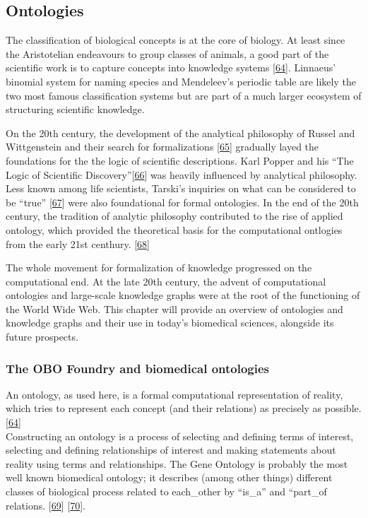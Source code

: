 \hypertarget{ontologies}{%
\subsection{Ontologies}\label{ontologies}}

The classification of biological concepts is at the core of biology. At least since the Aristotelian endeavours to group classes of animals, a good part of the scientific work is to capture concepts into knowledge systems {[}\protect\hyperlink{ref-DLTMbf54}{64}{]}.
Linnaeus' binomial system for naming species and Mendeleev's periodic table are likely the two most famous classification systems but are part of a much larger ecosystem of structuring scientific knowledge.

On the 20th century, the development of the analytical philosophy of Russel and Wittgenstein and their search for formalizations {[}\protect\hyperlink{ref-cZEmYsqx}{65}{]} gradually layed the foundations for the the logic of scientific descriptions.
Karl Popper and his ``The Logic of Scientific Discovery''{[}\protect\hyperlink{ref-to2onCDy}{66}{]} was heavily influenced by analytical philosophy.
Less known among life scientists, Tarski's inquiries on what can be considered to be ``true'' {[}\protect\hyperlink{ref-RghcuiSS}{67}{]} were also foundational for formal ontologies.
In the end of the 20th century, the tradition of analytic philosophy contributed to the rise of applied ontology, which provided the theoretical basis for the computational ontlogies from the early 21st centhury. {[}\protect\hyperlink{ref-35incsRu}{68}{]}

The whole movement for formalization of knowledge progressed on the computational end. At the late 20th century, the advent of computational ontologies and large-scale knowledge graphs were at the root of the functioning of the World Wide Web.
This chapter will provide an overview of ontologies and knowledge graphs and their use in today's biomedical sciences, alongside its future prospects.

\hypertarget{the-obo-foundry-and-biomedical-ontologies}{%
\subsubsection{The OBO Foundry and biomedical ontologies}\label{the-obo-foundry-and-biomedical-ontologies}}

An ontology, as used here, is a formal computational representation of reality, which tries to represent each concept (and their relations) as precisely as possible. {[}\protect\hyperlink{ref-DLTMbf54}{64}{]}\\
Constructing an ontology is a process of selecting and defining terms of interest, selecting and defining relationships of interest and making statements about reality using terms and relationships.
The Gene Ontology is probably the most well known biomedical ontology; it describes (among other things) different classes of biological process related to each\_other by ``is\_a'' and ``part\_of relations. {[}\protect\hyperlink{ref-18wkLcGxT}{69}{]} {[}\protect\hyperlink{ref-2KmDs8gy}{70}{]}.

